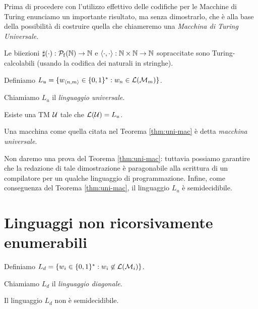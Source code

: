 \documentclass[runningheads,a4paper]{llncs}
\begin{document}
Prima di procedere con l'utilizzo effettivo delle codifiche per le Macchine di Turing enunciamo un importante risultato, ma senza dimostrarlo, che \`{e} alla base della possibilit\`{a} di costruire quella che chiameremo una \emph{Macchina di Turing Universale}.

\begin{proposition}\label{prop:cod-calc}
Le biiezioni $\sharp(\cdot): \mathcal{P}_{\mathrm{f}}(\mathbb{N}) \to \mathbb{N}$ e $\langle \cdot,\cdot \rangle: \mathbb{N} \times \mathbb{N} \to \mathbb{N}$ sopraccitate sono Turing-calcolabili (usando la codifica dei naturali in stringhe).
\end{proposition}

\begin{definition}\label{def:uni-lang}
Definiamo $L_u = \{w_{\langle n,m \rangle} \in \{0,1\}^* : w_n \in \mathcal{L}(\mathcal{M}_m)\}$.
\end{definition}

Chiamiamo $L_u$ il \emph{linguaggio universale}.

\begin{theorem}\label{thm:uni-mac}
Esiste una TM $\mathcal{U}$ tale che $\mathcal{L}(\mathcal{U}) = L_u$.
\end{theorem}

Una macchina come quella citata nel Teorema \ref{thm:uni-mac} \`{e} detta \emph{macchina universale}.

Non daremo una prova del Teorema \ref{thm:uni-mac}: tuttavia possiamo garantire che la redazione di tale dimostrazione \`{e} paragonabile alla scrittura di un compilatore per un qualche linguaggio di programmazione. Infine, come conseguenza del Teorema \ref{thm:uni-mac}, il linguaggio $L_u$ \`{e} semidecidibile.

\section{Linguaggi non ricorsivamente enumerabili}

\begin{definition}\label{def:diag-lang}
Definiamo $L_d = \{w_i \in \{0,1\}^* : w_i \not\in \mathcal{L}(\mathcal{M}_i)\}$.
\end{definition}

Chiamiamo $L_d$ il \emph{linguaggio diagonale}.

\begin{theorem}\label{thm:Ld-non-semidec}
Il linguaggio $L_d$ non \`{e} semidecidibile.
\end{theorem}
\end{document}
